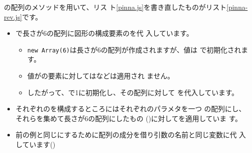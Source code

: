 \JS の配列のメソッドを用いて、\JS リス
ト\ref{pinna.js}を書き直したものが\JS リスト\ref{pinna-rev.js}です。

\begin{itemize}
 \item {}で長さが6の配列に図形の構成要素のを代
			 入しています。
			 \begin{itemize}
				\item \Verb+new Array(6)+は長さが6の配列が作成されますが、値は
							で初期化されます。
				\item 値がの要素に対してはなどは適用され
							ません。
				\item したがって、で1に初期化し、その配列に対して
							を代入しています。
			 \end{itemize}
 \item それぞれのを構成するところにはそれぞれのパラメタを一つ
			 の配列にし、それらを集めて長さが6の配列にしたもの
			 ()に対してを適用していま
			 す。
 \item 前の例と同じにするために配列の成分を借り引数の名前と同じ変数に代
			 入しています()
\end{itemize}
